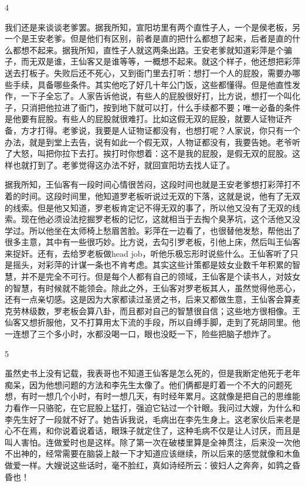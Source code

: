 4 

我们还是来谈谈老爹罢。据我所知，宣阳坊里有两个直性子人，一个是侯老板，另一个是王安老爹。但是他们有区别，前者是直的把什么都想了起来，后者是直的什么都想不起来。据我所知，直性子人就这两条出路。王安老爹就知道彩萍是个骗子，而无双是谁，王仙客又是谁等等，一概想不起来。就这个样子，他还想把彩萍送去打板子。失败后还不死心，又到衙门里去打听：想打一个人的屁股，需要办哪些手续，具备哪些条件。其实他吃了好几十年公门饭，这些都懂得。但是他直性发作，一下子全忘了。人家告诉他说，有些人的屁股很好打，比方说，想打一个叫化子，只消把他拉进了衙门，按到地下就可以打，什么手续都不要；唯一必备的条件是他要有屁股。有些人的屁股就很难打。比如这假无双的屁股，就要人证物证齐备，方才打得。老爹说，我要是人证物证都没有，也想打呢？人家说，你只有一个办法，就是到堂上去告，说有如此一个假无双，人物证都没有，我要告她。老爷听了大怒，叫把你拉下去打。挨打时你想着：这不是我的屁股，是假无双的屁股。这样也就打到了。老爹觉得这办法不好，就回宣阳坊去找人证了。 

据我所知，王仙客有一段时间心情很苦闷，这段时间也就是王安老爹想打彩萍打不着的时间。这段时间里，他知道罗老板听说过无双的下落，这就是说，他有了无双的线索。但是他又知道，罗老板肯定记不得无双的事了，所以他又没有了无双的线索。现在他必须设法挖掘罗老板的记忆，这就相当于去掏个臭茅坑，这个活他又没学过。所以他坐在太师椅上愁眉苦脸。彩萍在一边看了，也很替他发愁，帮他出了很多主意，其中有一些很巧妙。比方说，去勾引罗老板，引他上床，然后叫王仙客来捉奸。还有，去给罗老板做head job，听他乐极忘形时说些什么。王仙客听了只是摇头，对彩萍的计谋一条也不肯考虑。其实这些计策都是妓女业数千年积累的智慧，并不是完全不可行。但是每个人都有自己的领域，王仙客是个读书人，对妓女的智慧，有时候就不能领会。除此之外，王仙客对罗老板其人，虽然觉得他恶心，还有一点亲切感。这是因为大家都读过圣贤之书，后来又都做生意，王仙客会算麦克劳林级数，罗老板会算八卦，而且都对自己的智慧很自信；这些地方很相像。王仙客又想折服他，又不打算用太下流的手段，所以自缚手脚，走到了死胡同里。他一连想了三个多小时，水都没喝一口，眼也没眨一下，险些把脑子想炸了。 

5 

虽然史书上没有记载，我表哥也不知道王仙客是怎么死的，但是我断定他死于老年痴呆，因为他想问题的方法和李先生太像了。他们俩都是盯着一个不大的问题死想，有时一想几个小时，有时一想几天，有时经年累月。这就像是把自己的思维能力看作一只骆驼，在它屁股上猛打，强迫它钻过一个针眼。我问过大嫂，为什么和李先生好了一段就不好了。她告诉我说，毛病出在李先生身上。这老家伙后来老是心不在焉，和你说着说着话，眼珠子就定住了，这种毛病不仅是让人讨厌，而且是叫人害怕。连做爱时也是这样。除了第一次在破楼里算是全神贯注，后来没一次他不出神的，经常需要在脑袋上敲一下才知道应该继续，所以后来的感觉就像和木鱼做爱一样。大嫂说这些话时，毫不脸红，真如诗经所云：彼妇人之奔奔，如鹑之昏昏也！ 

